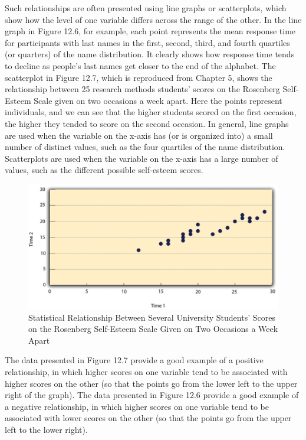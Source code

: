 Such relationships are often presented using line graphs or scatterplots, which show how the level of one variable differs across the range of the other. In the line graph in Figure 12.6, for example, each point represents the mean response time for participants with last names in the first, second, third, and fourth quartiles (or quarters) of the name distribution. It clearly shows how response time tends to decline as people's last names get closer to the end of the alphabet. The scatterplot in Figure 12.7, which is reproduced from Chapter 5, shows the relationship between 25 research methods students' scores on the Rosenberg Self-Esteem Scale given on two occasions a week apart. Here the points represent individuals, and we can see that the higher students scored on the first occasion, the higher they tended to score on the second occasion. In general, line graphs are used when the variable on the x-axis has (or is organized into) a small number of distinct values, such as the four quartiles of the name distribution. Scatterplots are used when the variable on the x-axis has a large number of values, such as the different possible self-esteem scores.

\begin{figure}

\includegraphics[width=.7\linewidth]{figures/Fig12-7}

\caption{ Statistical Relationship Between Several University Students' Scores on the Rosenberg Self-Esteem Scale Given on Two Occasions a Week Apart}

\label{fig:retest}

\end{figure}


The data presented in Figure 12.7 provide a good example of a positive relationship, in which higher scores on one variable tend to be associated with higher scores on the other (so that the points go from the lower left to the upper right of the graph). The data presented in Figure 12.6 provide a good example of a negative relationship, in which higher scores on one variable tend to be associated with lower scores on the other (so that the points go from the upper left to the lower right).

